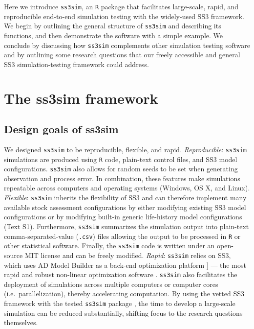 \documentclass[11pt]{article}
\begin{document}
Here we introduce \texttt{ss3sim}, an \texttt{R} package that facilitates large-scale, rapid, and reproducible end-to-end simulation testing with the widely-used SS3 framework. We begin by outlining the general structure of \texttt{ss3sim} and describing its functions, and then demonstrate the software with a simple example. We conclude by discussing how \texttt{ss3sim} complements other simulation testing software and by outlining some research questions that our freely accessible and general SS3 simulation-testing framework could address.

\section*{The ss3sim framework}

\subsection*{Design goals of ss3sim}

We designed \texttt{ss3sim} to be reproducible, flexible, and rapid. \emph{Reproducible}: \texttt{ss3sim} simulations are produced using \texttt{R} code, plain-text control files, and SS3 model configurations. \texttt{ss3sim} also allows for random seeds to be set when generating observation and process error. In combination, these features make simulations repeatable across computers and operating systems (Windows, OS X, and Linux). \emph{Flexible}: \texttt{ss3sim} inherits the flexibility of SS3 and can therefore implement many available stock assessment configurations by either modifying existing SS3 model configurations or by modifying built-in generic life-history model configurations (Text S1). Furthermore, \texttt{ss3sim} summarizes the simulation output into plain-text comma-separated-value (\texttt{.csv}) files allowing the output to be processed in \texttt{R} or other statistical software. Finally, the \texttt{ss3sim} code is written under an open-source MIT license and can be freely modified. \emph{Rapid}: \texttt{ss3sim} relies on SS3, which uses AD Model Builder as a back-end optimization platform \cite{fournier2012}{]} --- the most rapid and robust non-linear optimization software \cite{bolker2013}. \texttt{ss3sim} also facilitates the deployment of simulations across multiple computers or computer cores (i.e.~parallelization), thereby accelerating computation. By using the vetted SS3 framework \cite{methot2013} with the tested \texttt{ss3sim} package \cite{johnson2013, ono2013}, the time to develop a large-scale simulation can be reduced substantially, shifting focus to the research questions themselves.
\end{document}
